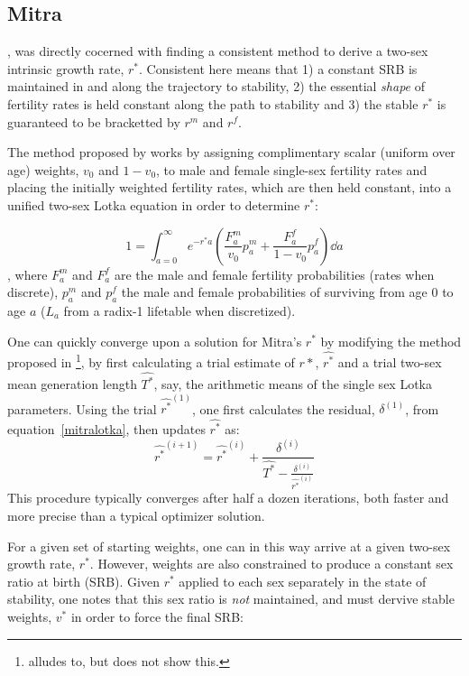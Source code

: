 \subsection{Mitra}

\citet{mitra1978derivation}, was directly cocerned with finding a consistent
method to derive a two-sex intrinsic growth rate, $r^\ast$. Consistent here
means that 1) a constant SRB is maintained in and along the trajectory to stability, 2) the
essential \textit{shape} of fertility rates is held constant along the path to
stability and 3) the stable $r^\ast$ is guaranteed to be bracketted by $r^m$ and
$r^f$.

The method proposed by \citet{mitra1978derivation} works by assigning
complimentary scalar (uniform over age) weights, $v_0$ and $1 - v_0$, to male
and female single-sex fertility rates and placing the initially weighted
fertility rates, which are then held constant, into a unified two-sex Lotka
equation in order to determine $r^\ast$:

\begin{equation}
\label{mitralotka}
1 = \int _{a=0} ^\infty e^{-r^\ast a} \left(\frac{F_a ^m}{v_0} p_a^m  +
\frac{F_a ^f}{1 - v_0} p_a^f\right) \dd a
\end{equation}
, where $F_a ^m$ and $F_a ^f$ are the male and female fertility probabilities
(rates when discrete), $p_a^m$ and $p_a^f$ the male and female probabilities of
surviving from age $0$ to age $a$ ($L_a$ from a radix-1 lifetable when
discretized).

One can quickly converge upon a solution for Mitra's $r^\ast$ by modifying the
method proposed in \citet{coale1957new}\footnote{\citet{mitra1978derivation} alludes
to, but does not show this.}, by first calculating a trial estimate of $r\ast$,
$\widehat{r^\ast}$ and a trial two-sex mean generation length
$\widehat{T^\ast}$, say, the arithmetic means of the single sex Lotka
parameters. Using the trial $\widehat{r^\ast}^{(1)}$, one first calculates the
residual, $\delta ^{(1)}$, from equation~\eqref{mitralotka}, then updates $\widehat{r^\ast}$ as:
\begin{equation}
\widehat{r^\ast}^{(i+1)} = \widehat{r^\ast}^{(i)} + \frac{\delta
^{(i)}}{\widehat{T^\ast} -
\frac{\delta ^{(i)}}{\widehat{r^\ast}^{(i)} }}
\end{equation}
This procedure typically converges after half a dozen iterations, both faster
and more precise than a typical optimizer solution.

For a given set of starting weights, one can in this way arrive at a given two-sex growth rate, $r^\ast$. 
However, weights are also constrained to produce a constant sex ratio at birth (SRB). Given $r^\ast$ applied 
to each sex separately in the
state of stability, one notes that this sex ratio is \textit{not} maintained,
and must dervive stable weights, $v^\ast$ in order to force the final
SRB:

